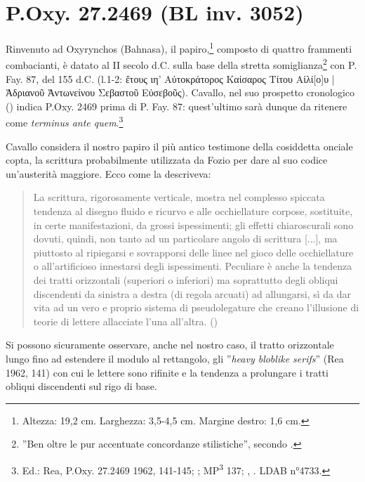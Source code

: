 \section{P.Oxy. 27.2469 (BL inv. 3052)}\label{bkm:RefHeading697951501267828}
Rinvenuto ad Oxyrynchos (Bahnasa), il papiro,\footnote{Altezza: 19,2 cm. Larghezza:
3,5-4,5 cm. Margine destro: 1,6 cm.}
composto di quattro frammenti combacianti, è datato al II secolo d.C. sulla base della
stretta somiglianza\footnote{''Ben oltre le pur accentuate
concordanze stilistiche'', secondo \cite[32]{Cavallo1975}.} con P. Fay. 87, del 155 d.C. (l.1-2:
\textgreek{ἔτους ιη' Αὐτοκράτορος  Καίσαρος  Τίτου  Αἰλί[ο]υ | Ἁδριανοῦ Ἀντωνείνου Σεβαστοῦ Εὐσεβοῦς}). Cavallo, nel suo prospetto cronologico
(\cite*[50]{Cavallo1975}) indica P.Oxy. 2469 prima di P. Fay. 87:
quest'ultimo sarà dunque da
ritenere come \textit{terminus ante
quem}.\footnote{Ed.:
Rea, P.Oxy. 27.2469 1962, 141-145; \cite[15-16]{Mette1978}; MP\textsuperscript{3} 137;
\cite[658-677]{Zuntz1938}, \cite[32s]{Cavallo1975}. LDAB n°4733.}


Cavallo considera il nostro papiro il più antico testimone della cosiddetta
onciale copta, la scrittura probabilmente utilizzata da Fozio per dare al suo
codice un'austerità maggiore. Ecco come la descriveva:


\begin{quotation}
\small{La scrittura, rigorosamente verticale, mostra nel complesso
spiccata tendenza al disegno fluido e ricurvo e alle occhiellature corpose,
sostituite, in certe manifestazioni, da grossi ispessimenti; gli effetti
chiaroscurali sono dovuti, quindi, non tanto ad un particolare angolo di
scrittura [...], ma piuttosto al ripiegarsi e sovrapporsi delle linee nel
gioco delle occhiellature o all'artificioso innestarsi degli
ispessimenti. Peculiare è anche la tendenza dei tratti orizzontali (superiori
o inferiori) ma soprattutto degli obliqui discendenti da sinistra a destra
(di regola arcuati) ad allungarsi, sì da dar vita ad un vero e proprio
sistema di pseudolegature che creano l'illusione di teorie
di lettere allacciate l'una
all'altra. (\cite[30]{Cavallo1975})}
\end{quotation}





Si possono sicuramente osservare, anche nel nostro caso, il tratto orizzontale
lungo fino ad estendere il modulo al rettangolo, gli ''\textit{heavy bloblike
serifs}'' (Rea 1962, 141) con cui le lettere sono rifinite e la tendenza a
prolungare i tratti obliqui discendenti sul rigo di base. 

